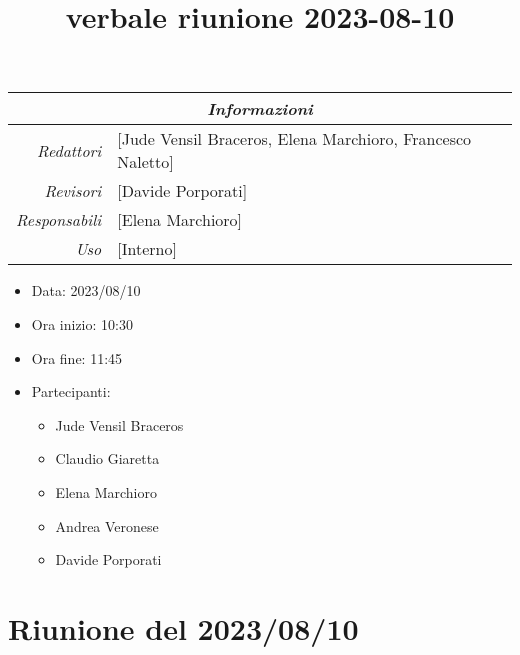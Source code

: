 \documentclass[12pt]{article}
\begin{document}
\graphicspath{ {../../templates/img} }

\title{verbale riunione 2023-08-10}

\firstPage
\maketitle

\begin{center}
\begin{tabular}{r | l}
    \multicolumn{2}{c}{\textit{Informazioni}}\\
    \hline
    
        \textit{Redattori} &
        [Jude Vensil Braceros, Elena Marchioro, Francesco Naletto]\makecell{}\\
    
        \textit{Revisori} &
        [Davide Porporati]\makecell{}\\
        \textit{Responsabili} &
        [Elena Marchioro]\makecell{}\\
            \textit{Uso} & 
            [Interno]\makecell{}\\
\end{tabular}
    \begin{itemize}
    \item[] Data: 2023/08/10
    \item[] Ora inizio: 10:30
    \item[] Ora fine: 11:45
    \item[] Partecipanti:
    \begin{itemize}
    \item[] Jude Vensil Braceros
    \item[] Claudio Giaretta
    \item[] Elena Marchioro
    \item[] Andrea Veronese
    \item[] Davide Porporati
    \end{itemize}
\end{itemize}
\end{center}


\tableofcontents
\printindex 
\section{Riunione del 2023/08/10}
\end{document}
